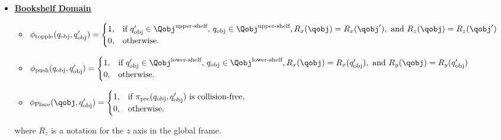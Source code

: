 \begin{itemize}
\begin{itemize}
        \item[] \underline{\textbf{Bookshelf Domain}}
            \begin{itemize}
                \item \(\phi_\text{topple}(q_\text{obj}, q'_\text{obj}) = 
                \begin{cases} 
                1, & \text{if } q'_\text{obj} \in \Qobj^\text{upper-shelf}, \, q_\text{obj} \in \Qobj^\text{upper-shelf}, R_x(\qobj) = R_x(\qobj'), \text{ and } R_z(\qobj) = R_z(\qobj') \\ 
                0, & \text{otherwise.} 
                \end{cases}\)
                \item \(\phi_\text{push}(q_\text{obj}, q'_\text{obj}) = 
                \begin{cases} 
                1, & \text{if } q'_\text{obj} \in \Qobj^\text{lower-shelf}, \, q_\text{obj} \in \Qobj^\text{lower-shelf}, R_x(\qobj)=R_x(q'_\text{obj}), \text{ and } R_y(\qobj)=R_y(q'_\text{obj})\\ 
                0, & \text{otherwise.} 
                \end{cases}\)

                \item \(\phi_\text{Place}(\qobj, q'_\text{obj}) = 
                \begin{cases} 
                1, & \text{if } \pi_\text{pre}(q_\text{obj}, q'_\text{obj}) \text{ is collision-free}, \\ 
                0, & \text{otherwise.} 
                \end{cases}\)
            \end{itemize}
        where \( R_z \) is a notation for the \( z \) axis in the global frame.


\end{itemize}
\end{itemize}
